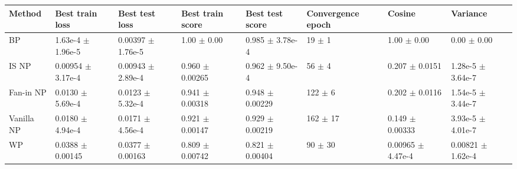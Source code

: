 \begin{tabular}{llllllll}
\toprule
Method & Best train loss & Best test loss & Best train score & Best test score & Convergence epoch & Cosine & Variance \\
\midrule
BP & 1.63e-4 $\pm$ 1.96e-5 & 0.00397 $\pm$ 1.76e-5 & 1.00 $\pm$ 0.00 & 0.985 $\pm$ 3.78e-4 & 19 $\pm$ 1 & 1.00 $\pm$ 0.00 & 0.00 $\pm$ 0.00 \\
IS NP & 0.00954 $\pm$ 3.17e-4 & 0.00943 $\pm$ 2.89e-4 & 0.960 $\pm$ 0.00265 & 0.962 $\pm$ 9.50e-4 & 56 $\pm$ 4 & 0.207 $\pm$ 0.0151 & 1.28e-5 $\pm$ 3.64e-7 \\
Fan-in NP & 0.0130 $\pm$ 5.69e-4 & 0.0123 $\pm$ 5.32e-4 & 0.941 $\pm$ 0.00318 & 0.948 $\pm$ 0.00229 & 122 $\pm$ 6 & 0.202 $\pm$ 0.0116 & 1.54e-5 $\pm$ 3.44e-7 \\
Vanilla NP & 0.0180 $\pm$ 4.94e-4 & 0.0171 $\pm$ 4.56e-4 & 0.921 $\pm$ 0.00147 & 0.929 $\pm$ 0.00219 & 162 $\pm$ 17 & 0.149 $\pm$ 0.00333 & 3.93e-5 $\pm$ 4.01e-7 \\
WP & 0.0388 $\pm$ 0.00145 & 0.0377 $\pm$ 0.00163 & 0.809 $\pm$ 0.00742 & 0.821 $\pm$ 0.00404 & 90 $\pm$ 30 & 0.00965 $\pm$ 4.47e-4 & 0.00821 $\pm$ 1.62e-4 \\
\bottomrule
\end{tabular}
